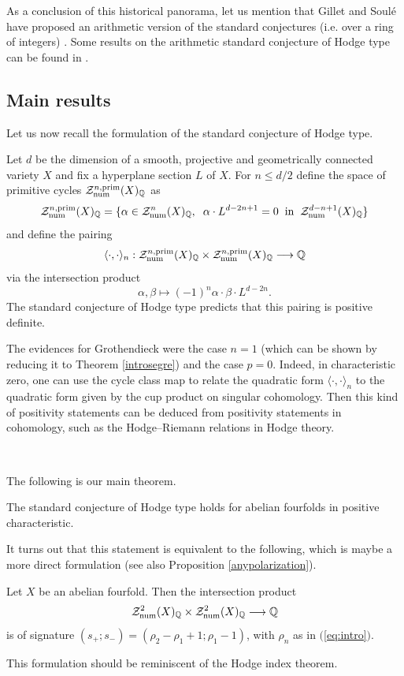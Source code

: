 \documentclass[11pt]{amsart}
\begin{document}
 
 As a conclusion of this historical panorama, let us mention that Gillet and Soul\'e have proposed an arithmetic version of the standard conjectures (i.e. over a ring of integers) \cite{soule}. Some results on the arithmetic standard conjecture of Hodge type can be found in \cite{Kunz1,Kunz2,Kunz3,Kresch}.
  
  \subsection*{Main results}
  Let us now recall the formulation of the standard conjecture of Hodge type.
  \begin{conj}
  Let   $d$ be the dimension of   a smooth, projective and geometrically connected variety $X$ and fix a hyperplane section $L$ of $X$.  For $n \leq d/2$ define the space of primitive cycles $\mathcal{Z}^{n,\mathrm{prim}}_{\mathrm{num}}(X)_{\mathbb{Q}}$ as
\[\mathcal{Z}^{n,\mathrm{prim}}_{\mathrm{num}}(X)_{\mathbb{Q}} = \{\alpha \in \mathcal{Z}^{n}_{\mathrm{num}}(X)_{\mathbb{Q}} , \hspace{0.2cm} \alpha \cdot L^ {{d-2n+1}}=0 \hspace{0.2cm}  \textrm{in}  \hspace{0.2cm}  \mathcal{Z}^{d-n+1}_{\mathrm{num}}(X)_{\mathbb{Q}}\}\]
and define the pairing  
\[\langle \cdot, \cdot \rangle_{n} : \mathcal{Z}^{n,\mathrm{prim}}_{\mathrm{num}}(X)_{\mathbb{Q}}  \times  \mathcal{Z}^{n,\mathrm{prim}}_{\mathrm{num}}(X)_{\mathbb{Q}}  \longrightarrow \mathbb{Q}\]
 via the intersection product
 \[\alpha, \beta \mapsto  (-1)^n \alpha \cdot \beta \cdot L^{d-2n}.\]
The   standard conjecture of Hodge type predicts that this pairing is positive definite.
\end{conj}
  
 
The evidences for Grothendieck were the case $n=1$ (which can be shown by reducing it to Theorem \ref{introsegre}) and the case     $p=0$. Indeed,  in characteristic zero, one can use the cycle class map to relate the quadratic form $\langle \cdot, \cdot \rangle_{n}$ to the quadratic form given by the cup product on singular cohomology. Then  this kind of positivity statements can be deduced from positivity statements in cohomology, such as the Hodge--Riemann relations in Hodge theory. 



\


 The following is our main theorem. 

\begin{theorem}\label{thmintro}
The standard conjecture of Hodge type holds for abelian fourfolds in positive characteristic.\end{theorem}
It turns out that this statement is equivalent to the following, which is maybe a more direct formulation (see also  Proposition \ref{anypolarization}).
\begin{theorem} 
Let $X$ be an abelian fourfold. Then the intersection product 
\[\mathcal{Z}^2_{\mathrm{num}}(X)_{\mathbb{Q}}\times \mathcal{Z}_{\mathrm{num}}^2(X)_{\mathbb{Q}} \longrightarrow \mathbb{Q}\]
is of signature  $ (s_+;s_-) = ( \rho_2 - \rho_1+1;  \rho_1-1)$, with $\rho_n$ as in $($\ref{eq:intro}$)$.
\end{theorem} 
This formulation should   be reminiscent of the Hodge index theorem.
\end{document}
